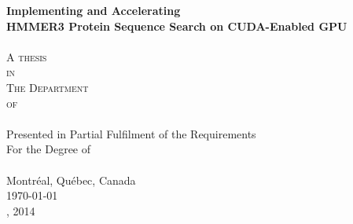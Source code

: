 \documentclass[11pt, a4paper, oneside]{Thesis} %
\title{\ttitle} %
\begin{document}
\frontmatter %


\fancyhead{} %
\cfoot{\thepage} %

\pagestyle{fancy} %

\newcommand{\HRule}{\rule{\linewidth}{0.5mm}} %

\hypersetup{pdfsubject=\subjectname}
\hypersetup{pdfauthor=\authornames}
\hypersetup{pdfkeywords=\keywordnames}


\pagestyle{empty}
\begin{center}

\vspace*{6ex}
{\huge \bfseries Implementing and Accelerating\\ HMMER3 Protein Sequence Search on CUDA-Enabled GPU}\\[4cm] %
 
\textsc {\Large \href{http://ca.linkedin.com/pub/lin-cheng/19/191/422} \authornames}\\[3cm] %

\large \textsc{A thesis\\ in\\ The Department\\ of\\ \deptname }\\[3cm] %
{Presented in Partial Fulfilment of the Requirements\\ For the Degree of \degreename \\ \univname\\ Montr\'{e}al, Qu\'{e}bec, Canada}\\[1cm]
 
{\large \today}\\ %
{\textcopyright \authornames, 2014}
 
\vfill
\end{center}
\end{document}
